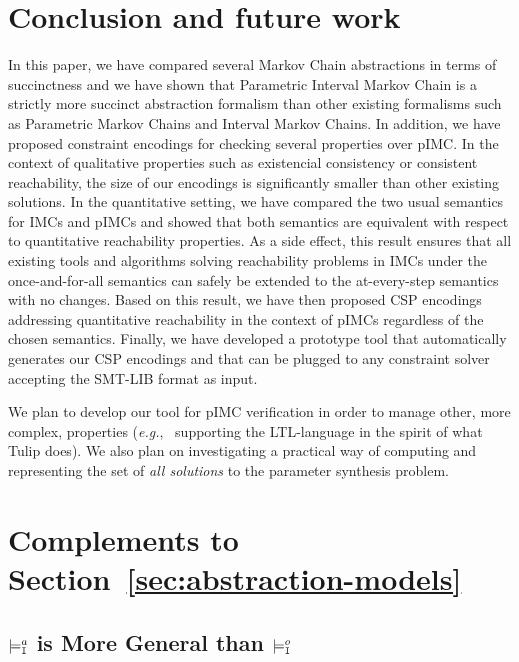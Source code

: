 \documentclass{llncs}
\newcommand{\imc}{\textnormal{IMC}}
\newcommand{\pimc}{\textnormal{pIMC}}
\newcommand{\csp}{\textnormal{CSP}}
\newcommand{\satisfactionImcOnce}{\ensuremath{\models^{o}_{\tt{I}}}}
\newcommand{\satisfactionImc}{\ensuremath{\models^{a}_{\tt{I}}}}
\newcommand{\eg} {{\em e.g.},\ }
\newcommand{\custompar}[1]{\smallskip \noindent {\bf #1}}
\begin{document}
\section{Conclusion and future work}
In this paper, we have compared several Markov Chain abstractions in
terms of succinctness and we have shown that Parametric Interval Markov Chain
is a strictly more succinct abstraction formalism than other existing
formalisms such as Parametric Markov Chains and Interval Markov
Chains. In addition, we have proposed constraint encodings for
checking several properties over {\pimc}. In the context of
qualitative properties such as existencial consistency or consistent
reachability, the size of our encodings is significantly smaller than
other existing solutions. In the quantitative setting, we have
compared the two usual semantics for {\imc}s and {\pimc}s and showed
that both semantics are equivalent with respect to quantitative
reachability properties. As a side effect, this result ensures that
all existing tools and algorithms solving reachability problems in
{\imc}s under the once-and-for-all semantics can safely be extended to
the at-every-step semantics with no changes. Based on this result, we have then proposed
{\csp} encodings addressing quantitative reachability in the context of
{\pimc}s regardless of the chosen semantics. Finally, we have
developed a prototype tool that automatically generates our {\csp}
encodings and that can be plugged to any constraint solver accepting
the SMT-LIB format as input. 


We plan to develop our tool for  {\pimc}
verification in order to manage other, more complex, properties (\eg
supporting the LTL-language in the spirit of what Tulip \cite{tulip}
does).  We also plan on investigating a practical way of computing and
representing the set of {\em all solutions} to the parameter synthesis
problem.





\newpage

\appendix

\section{Complements to Section~\ref{sec:abstraction-models}}

\subsection{$\satisfactionImc$ is More General
than $\satisfactionImcOnce$}\label{ap:compare_imcs_satisfaction_relations}
\end{document}
